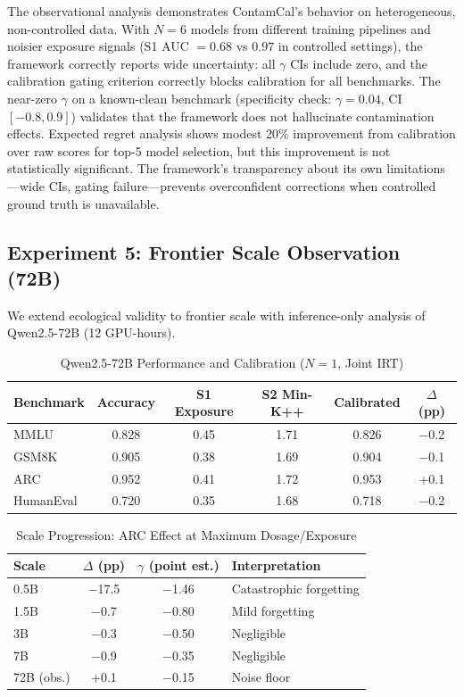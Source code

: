 \documentclass[11pt]{article}
\begin{document}
The observational analysis demonstrates ContamCal's behavior on heterogeneous, non-controlled data. With $N=6$ models from different training pipelines and noisier exposure signals (S1 AUC $= 0.68$ vs $0.97$ in controlled settings), the framework correctly reports wide uncertainty: all $\gamma$ CIs include zero, and the calibration gating criterion correctly blocks calibration for all benchmarks. The near-zero $\gamma$ on a known-clean benchmark (specificity check: $\gamma = 0.04$, CI $[-0.8, 0.9]$) validates that the framework does not hallucinate contamination effects. Expected regret analysis shows modest 20\% improvement from calibration over raw scores for top-5 model selection, but this improvement is not statistically significant. The framework's transparency about its own limitations---wide CIs, gating failure---prevents overconfident corrections when controlled ground truth is unavailable.

\subsection{Experiment 5: Frontier Scale Observation (72B)}
\label{sec:72b}

We extend ecological validity to frontier scale with inference-only analysis of Qwen2.5-72B (12 GPU-hours).

\begin{table}[h]
\centering
\caption{Qwen2.5-72B Performance and Calibration ($N=1$, Joint IRT)}
\label{tab:72b}
\begin{tabular}{lccccc}
\toprule
Benchmark & Accuracy & S1 Exposure & S2 Min-K++ & Calibrated & $\Delta$ (pp) \\
\midrule
MMLU & 0.828 & 0.45 & 1.71 & 0.826 & $-$0.2 \\
GSM8K & 0.905 & 0.38 & 1.69 & 0.904 & $-$0.1 \\
ARC & 0.952 & 0.41 & 1.72 & 0.953 & +0.1 \\
HumanEval & 0.720 & 0.35 & 1.68 & 0.718 & $-$0.2 \\
\bottomrule
\end{tabular}
\end{table}

\begin{table}[h]
\centering
\caption{Scale Progression: ARC Effect at Maximum Dosage/Exposure}
\label{tab:scale_prog}
\begin{tabular}{lccl}
\toprule
Scale & $\Delta$ (pp) & $\gamma$ (point est.) & Interpretation \\
\midrule
0.5B & $-$17.5 & $-$1.46 & Catastrophic forgetting \\
1.5B & $-$0.7 & $-$0.80 & Mild forgetting \\
3B & $-$0.3 & $-$0.50 & Negligible \\
7B & $-$0.9 & $-$0.35 & Negligible \\
72B (obs.) & +0.1 & $-$0.15 & Noise floor \\
\bottomrule
\end{tabular}
\end{table}
\end{document}
